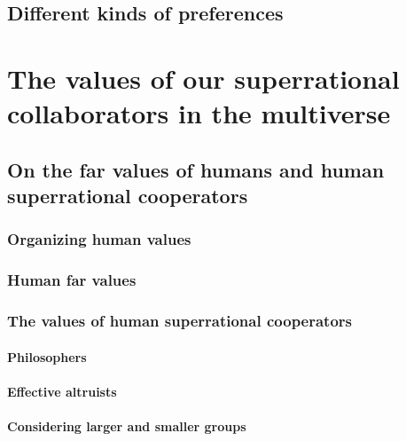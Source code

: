 \documentclass{book}
\begin{document}
\subsection{Different kinds of preferences}
\label{Different kinds of preferences}

\section{The values of our superrational collaborators in the multiverse}
\label{The values of our superrational collaborators in the multiverse}

\subsection{On the far values of humans and human superrational cooperators}
\label{On the far values of humans and human superrational cooperators}

\subsubsection{Organizing human values}
\label{Organizing human values}

\subsubsection{Human far values}
\label{Human far values}

\subsubsection{The values of human superrational cooperators}
\label{The values of human superrational cooperators}

\paragraph{Philosophers}
\label{Philosophers}

\paragraph{Effective altruists}
\label{Effective altruists}

\paragraph{Considering larger and smaller groups}
\label{Considering larger and smaller groups}
\end{document}
